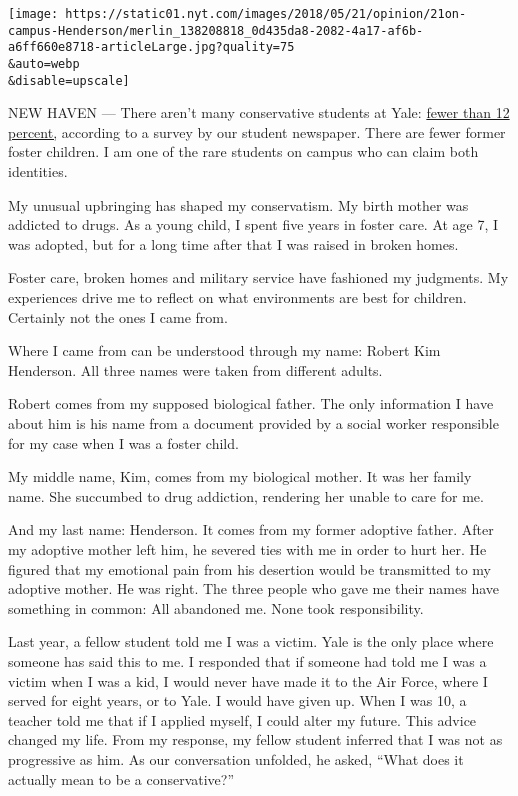 \texttt{[image: https://static01.nyt.com/images/2018/05/21/opinion/21on-campus-Henderson/merlin\_138208818\_0d435da8-2082-4a17-af6b-a6ff660e8718-articleLarge.jpg?quality=75\\\&auto=webp\\\&disable=upscale]}

NEW HAVEN --- There aren't many conservative students at Yale:
\href{http://features.yaledailynews.com/blog/2016/10/27/election-2016-conservative-views-considered-unwelcome-at-yale/}{fewer
than 12 percent,} according to a survey by our student newspaper. There
are fewer former foster children. I am one of the rare students on
campus who can claim both identities.

My unusual upbringing has shaped my conservatism. My birth mother was
addicted to drugs. As a young child, I spent five years in foster care.
At age 7, I was adopted, but for a long time after that I was raised in
broken homes.

Foster care, broken homes and military service have fashioned my
judgments. My experiences drive me to reflect on what environments are
best for children. Certainly not the ones I came from.

Where I came from can be understood through my name: Robert Kim
Henderson. All three names were taken from different adults.

Robert comes from my supposed biological father. The only information I
have about him is his name from a document provided by a social worker
responsible for my case when I was a foster child.

My middle name, Kim, comes from my biological mother. It was her family
name. She succumbed to drug addiction, rendering her unable to care for
me.

And my last name: Henderson. It comes from my former adoptive father.
After my adoptive mother left him, he severed ties with me in order to
hurt her. He figured that my emotional pain from his desertion would be
transmitted to my adoptive mother. He was right. The three people who
gave me their names have something in common: All abandoned me. None
took responsibility.

Last year, a fellow student told me I was a victim. Yale is the only
place where someone has said this to me. I responded that if someone had
told me I was a victim when I was a kid, I would never have made it to
the Air Force, where I served for eight years, or to Yale. I would have
given up. When I was 10, a teacher told me that if I applied myself, I
could alter my future. This advice changed my life. From my response, my
fellow student inferred that I was not as progressive as him. As our
conversation unfolded, he asked, ``What does it actually mean to be a
conservative?''

